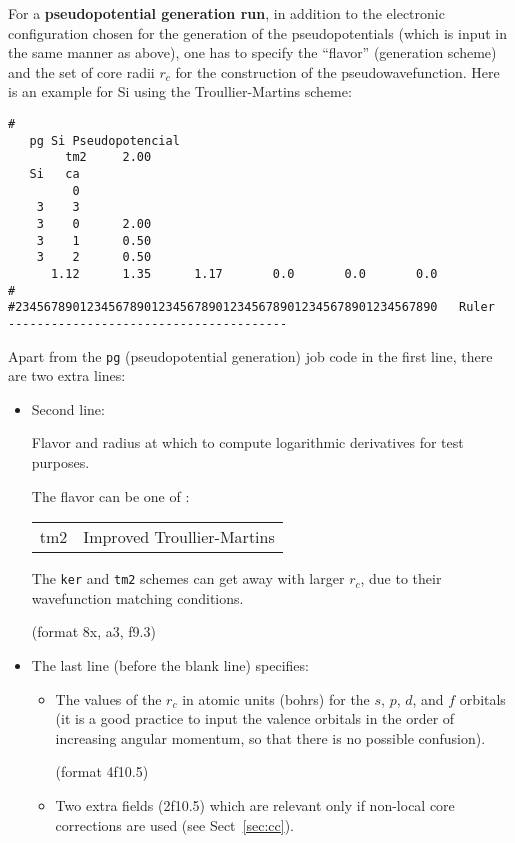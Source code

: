 \documentclass[11pt]{article}
\begin{document}
For a {\bf pseudopotential generation run}, in addition to the
electronic configuration chosen for the generation of the
pseudopotentials (which is input in the same manner as above), one has
to specify the ``flavor'' (generation scheme) and the set of core
radii $r_c$ for the construction of the pseudowavefunction. Here is an
example for Si using the Troullier-Martins scheme:

\begin{verbatim}
#
   pg Si Pseudopotencial
        tm2     2.00
   Si   ca
         0
    3    3
    3    0      2.00
    3    1      0.50
    3    2      0.50
      1.12      1.35      1.17       0.0       0.0       0.0
#
#23456789012345678901234567890123456789012345678901234567890   Ruler
---------------------------------------
\end{verbatim}

Apart from the {\tt pg} (pseudopotential generation) job code in the
first line, there are two extra lines:

\begin{itemize}
\item Second line:

Flavor and radius at which to compute logarithmic
derivatives for test purposes.

The flavor can be one of :
\begin{tabular}{ll}
	tm2	&Improved Troullier-Martins\\
\end{tabular}

The {\tt ker} and {\tt tm2} schemes can get away with larger $r_c$,
due to their wavefunction matching conditions.

(format 8x, a3, f9.3)

\item The last line (before the blank line) specifies:

\begin{itemize}
\item The values of the $r_c$ in atomic units (bohrs) for the $s$,
$p$, $d$, and $f$ orbitals (it is a good practice to input the valence
orbitals in the order of increasing angular momentum, so that there is
no possible confusion).

(format 4f10.5)

\item Two extra fields (2f10.5) which are relevant only if non-local
core corrections are used (see Sect~\ref{sec:cc}).
\end{itemize}
\end{itemize}
\end{document}
